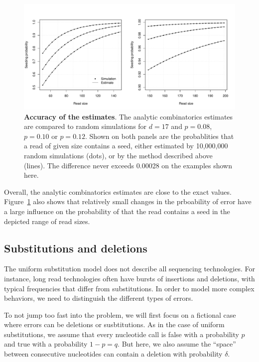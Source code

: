 \documentclass{article}
\begin{document}
\begin{figure}[h]
\centering
\includegraphics[scale=0.445]{simulp.pdf}
\caption{\textbf{Accuracy of the estimates}. The analytic combinatorics
estimates are compared to random simulations for $d=17$ and $p=0.08$,
$p=0.10$ or $p=0.12$. Shown on both panels are the probablities that a
read of given size contains a seed, either estimated by 10,000,000 random
simulations (dots), or by the method described above (lines). The
difference never exceeds 0.00028 on the examples shown here.}
\label{fig:simulp}
\end{figure}

Overall, the analytic combinatorics estimates are close to the exact
values. Figure~\ref{fig:simulp} also shows that relatively small changes
in the prboability of error have a large influence on the probability of
that the read contains a seed in the depicted range of read sizes.

\subsection{Substitutions and deletions}

The uniform substitution model does not describe all sequencing
technologies. For instance, long read technologies often have bursts of
insertions and deletions, with typical frequencies that differ from
substitutions. In order to model more complex behaviors, we need to
distinguish the different types of errors.

To not jump too fast into the problem, we will first focus on a fictional
case where errors can be deletions or susbtitutions. As in the case of
uniform substitutions, we assume that every nucleotide call is false with
a probability $p$ and true with a probability $1-p=q$. But here, we also
assume the ``space''  between consecutive nucleotides can contain a
deletion with probability $\delta$.
\end{document}
